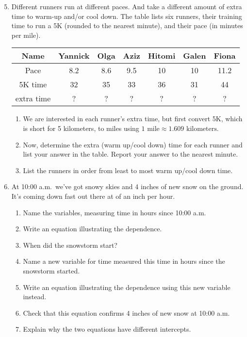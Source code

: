 \begin{enumerate} 
\setcounter{enumi}{4}

\item Different runners run at different paces.  And take a different amount of extra time to warm-up and/or cool down. The table lists six runners, their training time to run a 5K (rounded to the nearest minute), and their pace (in minutes per mile).  
\begin{center}
\begin{tabular} {|c| |c  |c |c |c |c |c|}\hline
Name & Yannick & Olga & Aziz & Hitomi & Galen & Fiona\\ \hline
Pace & 8.2 & 8.6 & 9.5 & 10 & 10 & 11.2 \\ \hline
5K time & 32 & 35 & 33 & 36 & 31 & 44 \\ \hline
extra time & ? & ? & ? & ? & ? & ? \\ \hline
\end{tabular}
\end{center}
\begin{enumerate}
\item We are interested in each runner's extra time, but first convert 5K, which is short for 5 kilometers, to miles using $1 \text{ mile} \approx 1.609 \text{ kilometers}$.
\item Now, determine the extra (warm up/cool down) time for each runner and list your answer in the table.  Report your answer to the nearest minute.
\item List the runners in order from least to most warm up/cool down time.
\end{enumerate}

\item At 10:00 a.m.\ we've got snowy skies and 4 inches of new snow on the ground.  It's coming down fast out there at  of an inch per hour.
\begin{enumerate}
\item Name the variables, measuring time in hours since 10:00 a.m.  
\item Write an equation illustrating the dependence.
\item When did the snowstorm start?
\item Name a new variable for time measured this time in hours since the snowstorm started.  
\item Write an equation illustrating the dependence using this new variable instead.  
\item Check that this equation confirms 4 inches of new snow at 10:00 a.m.
\item Explain why the two equations have different intercepts.
\end{enumerate}


\end{enumerate}
